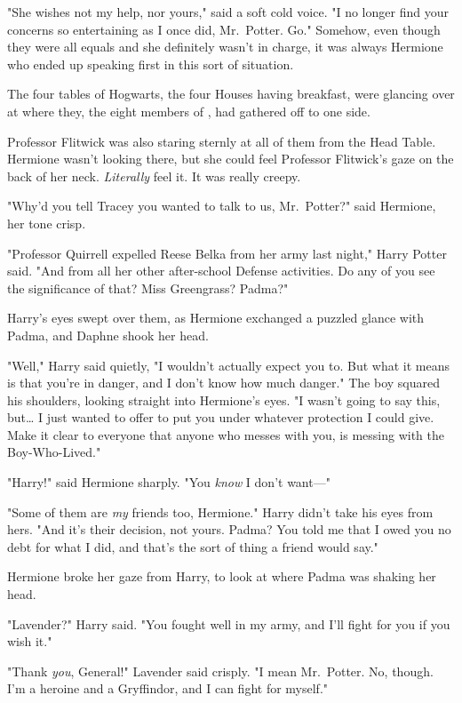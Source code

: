 "She wishes not my help, nor yours," said a soft cold voice. "I no longer find 
your concerns so entertaining as I once did, Mr.~Potter. Go."
\sbreak
Somehow, even though they were all equals and she definitely wasn't in charge, 
it was always Hermione who ended up speaking first in this sort of situation.

The four tables of Hogwarts, the four Houses having breakfast, were glancing 
over at where they, the eight members of \SPHEW, had gathered off to one 
side.

Professor Flitwick was also staring sternly at all of them from the Head Table. 
Hermione wasn't looking there, but she could feel Professor Flitwick's gaze on 
the back of her neck. \emph{Literally} feel it. It was really creepy.

"Why'd you tell Tracey you wanted to talk to us, Mr.~Potter?" said Hermione, 
her tone crisp.

"Professor Quirrell expelled Reese Belka from her army last night," Harry 
Potter said. "And from all her other after-school Defense activities. Do any of 
you see the significance of that? Miss Greengrass? Padma?"

Harry's eyes swept over them, as Hermione exchanged a puzzled glance with 
Padma, and Daphne shook her head.

"Well," Harry said quietly, "I wouldn't actually expect you to. But what it 
means is that you're in danger, and I don't know how much danger." The boy 
squared his shoulders, looking straight into Hermione's eyes. "I wasn't going 
to say this, but{\ldots} I just wanted to offer to put you under whatever 
protection I could give. Make it clear to everyone that anyone who messes with 
you, is messing with the Boy-Who-Lived."

"Harry!" said Hermione sharply. "You \emph{know} I don't want---"

"Some of them are \emph{my} friends too, Hermione." Harry didn't take his eyes 
from hers. "And it's their decision, not yours. Padma? You told me that I owed 
you no debt for what I did, and that's the sort of thing a friend would say."

Hermione broke her gaze from Harry, to look at where Padma was shaking her head.

"Lavender?" Harry said. "You fought well in my army, and I'll fight for you if 
you wish it."

"Thank \emph{you}, General!" Lavender said crisply. "I mean Mr.~Potter. No, 
though. I'm a heroine and a Gryffindor, and I can fight for myself."

